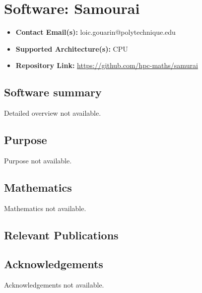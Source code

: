 \section{Software: Samourai}
\label{sec:Samourai:software}



\begin{itemize}
    \item \textbf{Contact Email(s):} loic.gouarin@polytechnique.edu
    \item \textbf{Supported Architecture(s):} CPU
    \item \textbf{Repository Link:} \href{https://github.com/hpc-maths/samurai}{https://github.com/hpc-maths/samurai}
\end{itemize}

\subsection{Software summary}
\label{sec:Samourai:summary}
Detailed overview not available.



\subsection{Purpose}
\label{sec:Samourai:purpose}
Purpose not available.



\subsection{Mathematics}
\label{sec:Samourai:mathematics}
Mathematics not available.


\subsection{Relevant Publications}
\label{sec:Samourai:publications}

\subsection{Acknowledgements}
\label{sec::Samourai:acknowledgements}

Acknowledgements not available.


